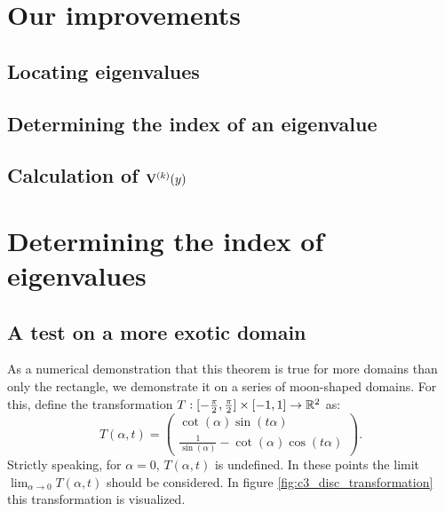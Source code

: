 \section{Our improvements}

\subsection{Locating eigenvalues}\label{sec:c3_locating_e}

\subsection{Determining the index of an eigenvalue}\label{sec:c3_index_of_e}

\subsection{Calculation of \texorpdfstring{$\vb{V}^{(k)}(y)$}{Vk(y)}}\label{sec:c3_calculate_vk}


\section{Determining the index of eigenvalues}

\begin{theorem}
    \label{the:c3_counting_eigenvalues}
\end{theorem}

\subsection{A test on a more exotic domain}

As a numerical demonstration that this theorem is true for more domains than only the rectangle, we demonstrate it on a series of moon-shaped domains. For this, define the transformation $T:[-\frac{\pi}{2}, \frac{\pi}{2}] \times [-1, 1] \to \mathbb{R}^2$ as:
\begin{equation}\label{equ:c3_disc_transformation}
    T(\alpha, t) = \begin{pmatrix}
        \cot(\alpha) \sin(t \alpha) \\
        \frac{1}{\sin(\alpha)} - \cot(\alpha) \cos(t \alpha)
    \end{pmatrix}\text{.}
\end{equation}
Strictly speaking, for $\alpha = 0$,  $T(\alpha, t)$ is undefined. In these points the limit $\lim_{\alpha \to 0} T(\alpha, t)$ should be considered. In figure \ref{fig:c3_disc_transformation} this transformation is visualized.

